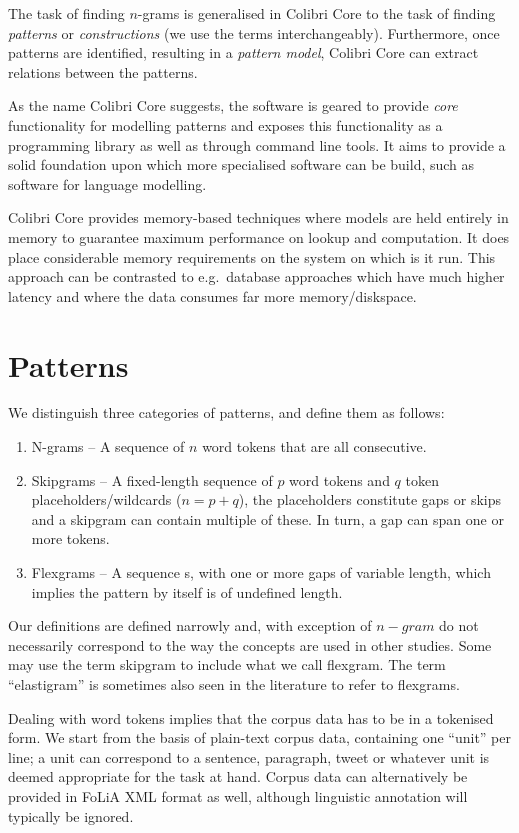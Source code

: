 \documentclass[review]{elsarticle}
\begin{document}
The task of finding $n$-grams is generalised in Colibri Core to the task of
finding \emph{patterns} or \emph{constructions} (we use the terms
interchangeably). Furthermore, once patterns are identified, resulting in a
\emph{pattern model}, Colibri Core can extract relations between the patterns.

As the name Colibri Core suggests, the software is geared to provide
\emph{core} functionality for modelling patterns and exposes this functionality
as a programming library as well as through command line tools. It aims to
provide a solid foundation upon which more specialised software can be build,
such as software for language modelling.

Colibri Core provides memory-based techniques where models are held entirely in
memory to guarantee maximum performance on lookup and computation. It does
place considerable memory requirements on the system on which is it run. This
approach can be contrasted to e.g.\ database approaches which have much higher
latency and where the data consumes far more memory/diskspace.

\section{Patterns}

We distinguish three categories of patterns, and define them as follows:

\begin{enumerate}
    \item N-grams -- A sequence of $n$ word tokens that are all consecutive.
    \item Skipgrams -- A fixed-length sequence of $p$ word tokens and $q$ token placeholders/wildcards ($n=p+q$), the placeholders constitute gaps or skips and a skipgram can contain multiple of these. In turn, a gap can span one or more tokens. 
    \item Flexgrams -- A sequence s, with one or more gaps of variable length, which implies the pattern by itself is of undefined length.
\end{enumerate}

Our definitions are defined narrowly and, with exception of $n-gram$ do not
necessarily correspond to the way the concepts are used in other studies. Some
may use the term skipgram to include what we call flexgram.  The term
``elastigram'' is sometimes also seen in the literature to refer to flexgrams. 

Dealing with word tokens implies that the corpus data has to be in a
tokenised form. We start from the basis of plain-text corpus data, containing one
``unit'' per line; a unit can correspond to a sentence, paragraph, tweet
or whatever unit is deemed appropriate for the task at hand. Corpus data can
alternatively be provided in FoLiA XML format \cite{FOLIAPAPER} as well, although linguistic
annotation will typically be ignored.
\end{document}
